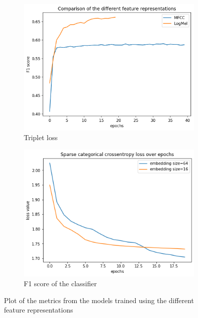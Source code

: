 \begin{figure}[htb]
\centering
\begin{subfigure}{.5\linewidth}
  \centering
  \includegraphics[width=.9\linewidth]{study-doc/experiment_feature/assets/f1_feature_representation.png}
  \caption{Triplet loss}
  \label{fig:plot-triplet-loss-feature-representations}
\end{subfigure}%
\begin{subfigure}{.5\linewidth}
  \centering
  \includegraphics[width=.9\linewidth]{study-doc/experiment_embedding_size/assets/classifier_loss.png}
  \caption{F1 score of the classifier}
  \label{fig:classifier-f1-feature-represenations}
\end{subfigure}
\caption{Plot of the metrics from the models trained using the different feature representations}
\label{fig:feature-experiment-metrics}
\end{figure}
